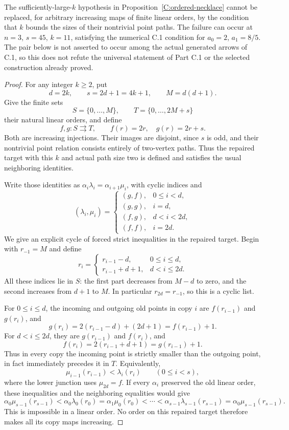 \begin{proposition}
\label{C:ordered-necklace-short-warning}
The sufficiently-large-$k$ hypothesis in
Proposition~\ref{C:ordered-necklace} cannot be replaced, for arbitrary
increasing maps of finite linear orders, by the condition that $k$
bounds the sizes of their nontrivial point paths. The failure can
occur at $n=3$, $s=45$, $k=11$, satisfying the numerical C.1 condition
for $a_0=2$, $a_1=8/5$.
The pair below is not asserted to occur among the actual generated
arrows of C.1, so this does not refute the universal statement of
Part C.1 or the selected construction already proved.
\end{proposition}

\begin{proof}
For any integer $k\geq2$, put
\[
 d=2k,\qquad s=2d+1=4k+1,\qquad M=d(d+1).
\]
Give the finite sets
\[
 S=\{0,\ldots,M\},\qquad T=\{0,\ldots,2M+s\}
\]
their natural linear orders, and define
\[
 f,g:S\rightrightarrows T,
 \qquad f(r)=2r,\quad g(r)=2r+s.
\]
Both are increasing injections. Their images are disjoint, since
$s$ is odd, and their nontrivial point relation consists entirely
of two-vertex paths. Thus the repaired target with this $k$ and
actual path size two is defined and satisfies the usual neighboring
identities.

Write those identities as
$\alpha_i\lambda_i=\alpha_{i+1}\mu_i$, with cyclic indices and
\[
 (\lambda_i,\mu_i)=
 \begin{cases}
 (g,f),&0\leq i<d,\\
 (g,g),&i=d,\\
 (f,g),&d<i<2d,\\
 (f,f),&i=2d.
 \end{cases}
\]
We give an explicit cycle of forced strict inequalities in the
repaired target. Begin with $r_{-1}=M$ and define
\[
 r_i=
 \begin{cases}
 r_{i-1}-d,&0\leq i\leq d,\\
 r_{i-1}+d+1,&d<i\leq2d.
 \end{cases}
\]
All these indices lie in $S$: the first part decreases from $M-d$
to zero, and the second increases from $d+1$ to $M$.
In particular $r_{2d}=r_{-1}$, so this is a cyclic list.

For $0\leq i\leq d$, the incoming and outgoing old points in copy
$i$ are $f(r_{i-1})$ and $g(r_i)$, and
\[
 g(r_i)=2(r_{i-1}-d)+(2d+1)=f(r_{i-1})+1.
\]
For $d<i\leq2d$, they are $g(r_{i-1})$ and $f(r_i)$, and
\[
 f(r_i)=2(r_{i-1}+d+1)=g(r_{i-1})+1.
\]
Thus in every copy the incoming point is strictly smaller than the
outgoing point, in fact immediately precedes it in $T$. Equivalently,
\[
 \mu_{i-1}(r_{i-1})<\lambda_i(r_i)
 \qquad(0\leq i<s),
\]
where the lower junction uses $\mu_{2d}=f$.
If every $\alpha_i$ preserved the old linear order, these inequalities
and the neighboring equalities would give
\[
 \alpha_0\mu_{s-1}(r_{s-1})
 <\alpha_0\lambda_0(r_0)
 =\alpha_1\mu_0(r_0)
 <\cdots
 <\alpha_{s-1}\lambda_{s-1}(r_{s-1})
 =\alpha_0\mu_{s-1}(r_{s-1}).
\]
This is impossible in a linear order. No order on this repaired
target therefore makes all its copy maps increasing.


\end{proof}
